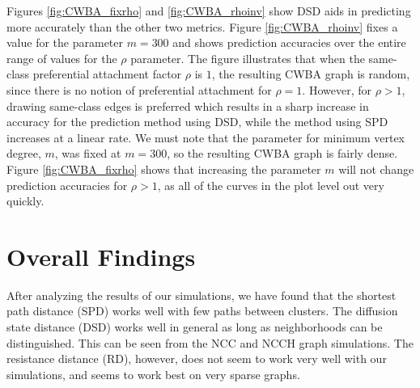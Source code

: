 Figures \ref{fig:CWBA_fixrho} and \ref{fig:CWBA_rhoinv} show DSD aids in predicting more accurately
than the other two metrics. Figure \ref{fig:CWBA_rhoinv} fixes a value for the parameter $m = 300$
and shows prediction accuracies over the entire range of values for the $\rho$ parameter. The figure
illustrates that when the same-class preferential attachment factor $\rho$ is $1$, the resulting
CWBA graph is random, since there is no notion of preferential attachment for $\rho=1$. However, for
$\rho > 1$, drawing same-class edges is preferred which results in a sharp increase in accuracy for
the prediction method using DSD, while the method using SPD increases at a linear rate. We must note
that the parameter for minimum vertex degree, $m$, was fixed at $m=300$, so the resulting CWBA graph
is fairly dense. Figure \ref{fig:CWBA_fixrho} shows that increasing the parameter $m$ will not
change prediction accuracies for $\rho > 1$, as all of the curves in the plot level out very
quickly.

\section{Overall Findings}
After analyzing the results of our simulations, we have found that the 
shortest path distance (SPD) works well with few paths between clusters. The
diffusion state distance (DSD) works well in general as long as neighborhoods
can be distinguished. This can be seen from the NCC and NCCH graph 
simulations. The resistance distance (RD), however, does not seem to work
very well with our simulations, and seems to work best on very sparse graphs.
